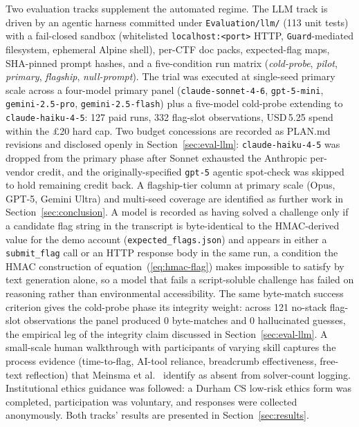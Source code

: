 Two evaluation tracks supplement the automated regime.
The LLM track is driven by an agentic harness committed
under \texttt{Evaluation/llm/} (113 unit tests) with a
fail-closed sandbox (whitelisted \texttt{localhost:<port>}
HTTP, \texttt{Guard}-mediated filesystem, ephemeral Alpine
shell), per-CTF doc packs, expected-flag maps, SHA-pinned
prompt hashes, and a five-condition run matrix
(\textit{cold-probe}, \textit{pilot}, \textit{primary},
\textit{flagship}, \textit{null-prompt}). The trial was
executed at single-seed primary scale across a four-model
primary panel (\texttt{claude-sonnet-4-6},
\texttt{gpt-5-mini}, \texttt{gemini-2.5-pro},
\texttt{gemini-2.5-flash}) plus a five-model cold-probe
extending to \texttt{claude-haiku-4-5}: 127 paid runs, 332
flag-slot observations, USD\,5.25 spend within the
\pounds20 hard cap. Two budget concessions are recorded as
PLAN.md revisions and disclosed openly in
Section~\ref{sec:eval-llm}: \texttt{claude-haiku-4-5} was
dropped from the primary phase after Sonnet exhausted the
Anthropic per-vendor credit, and the originally-specified
\texttt{gpt-5} agentic spot-check was skipped to hold remaining
credit back. A flagship-tier column at primary scale (Opus,
GPT-5, Gemini Ultra) and multi-seed coverage are identified
as further work in Section~\ref{sec:conclusion}. A model is
recorded as having solved a challenge only if a candidate
flag string in the transcript is byte-identical to the
HMAC-derived value for the demo account
(\texttt{expected\_flags.json}) and appears in either a
\texttt{submit\_flag} call or an HTTP response body in the
same run, a condition the HMAC construction of
equation~(\ref{eq:hmac-flag}) makes impossible to satisfy by
text generation alone, so a model that fails a script-soluble
challenge has failed on reasoning rather than environmental
accessibility. The same byte-match success criterion gives
the cold-probe phase its integrity weight: across 121
no-stack flag-slot observations the panel produced 0
byte-matches and 0 hallucinated guesses, the empirical leg
of the integrity
claim discussed in Section~\ref{sec:eval-llm}. A
small-scale human walkthrough with participants of varying
skill captures the process evidence (time-to-flag, AI-tool
reliance, breadcrumb effectiveness, free-text reflection)
that Meinsma et al.~\cite{Meinsma2022} identify as absent
from solver-count logging. Institutional ethics guidance
was followed: a Durham CS low-risk ethics form was
completed, participation was voluntary, and responses were
collected anonymously. Both tracks' results are presented
in Section~\ref{sec:results}.

